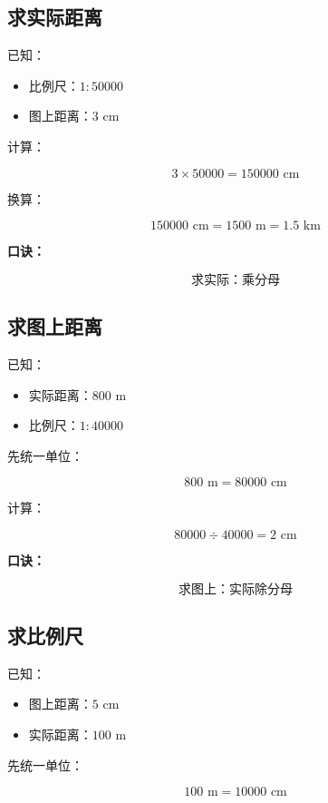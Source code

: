 \documentclass[DIN, pagenumber=false, fontsize=11pt, parskip=half]{scrartcl}
\begin{document}
\subsection{求实际距离}

已知：

\begin{itemize}
    \item 比例尺：$1:50000$
    \item 图上距离：$3$ cm
\end{itemize}

计算：

\[
3\times 50000=150000\text{ cm}
\]

换算：

\[
150000\text{ cm}
=
1500\text{ m}
=
1.5\text{ km}
\]

\textbf{口诀：}

\[
\boxed{\text{求实际：乘分母}}
\]

\subsection{求图上距离}

已知：

\begin{itemize}
    \item 实际距离：$800$ m
    \item 比例尺：$1:40000$
\end{itemize}

先统一单位：

\[
800\text{ m}=80000\text{ cm}
\]

计算：

\[
80000\div40000=2\text{ cm}
\]

\textbf{口诀：}

\[
\boxed{\text{求图上：实际除分母}}
\]

\subsection{求比例尺}

已知：

\begin{itemize}
    \item 图上距离：$5$ cm
    \item 实际距离：$100$ m
\end{itemize}

先统一单位：

\[
100\text{ m}=10000\text{ cm}
\]
\end{document}
